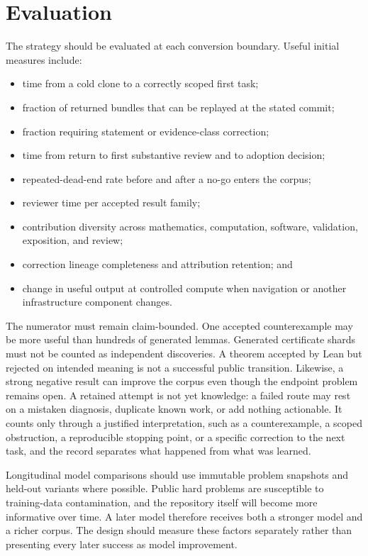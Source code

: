 \documentclass[10pt]{article}
\begin{document}
\section{Evaluation}\label{sec:evaluation}

The strategy should be evaluated at each conversion boundary.  Useful initial
measures include:

\begin{itemize}
\item time from a cold clone to a correctly scoped first task;
\item fraction of returned bundles that can be replayed at the stated commit;
\item fraction requiring statement or evidence-class correction;
\item time from return to first substantive review and to adoption decision;
\item repeated-dead-end rate before and after a no-go enters the corpus;
\item reviewer time per accepted result family;
\item contribution diversity across mathematics, computation, software,
      validation, exposition, and review;
\item correction lineage completeness and attribution retention; and
\item change in useful output at controlled compute when navigation or another
      infrastructure component changes.
\end{itemize}

The numerator must remain claim-bounded.  One accepted counterexample may be
more useful than hundreds of generated lemmas.  Generated certificate shards
must not be counted as independent discoveries.  A theorem accepted by Lean
but rejected on intended meaning is not a successful public transition.
Likewise, a strong negative result can improve the corpus even though the
endpoint problem remains open.  A retained attempt is not yet knowledge: a
failed route may rest on a mistaken diagnosis, duplicate known work, or add
nothing actionable.  It counts only through a justified interpretation, such as
a counterexample, a scoped obstruction, a reproducible stopping point, or a
specific correction to the next task, and the record separates what happened
from what was learned.

Longitudinal model comparisons should use immutable problem snapshots and
held-out variants where possible.  Public hard problems are susceptible to
training-data contamination, and the repository itself will become more
informative over time.  A later model therefore receives both a stronger
model and a richer corpus.  The design should measure these factors
separately rather than presenting every later success as model improvement.
\end{document}
